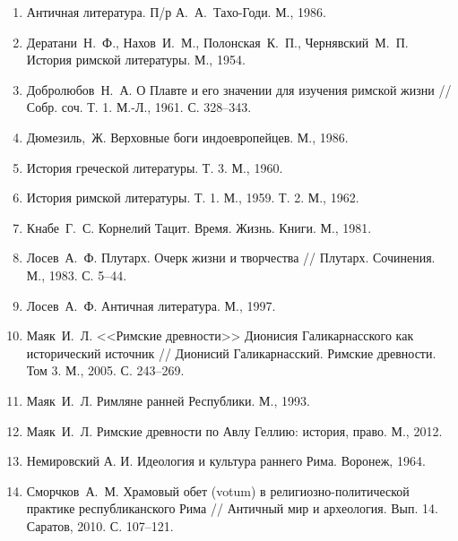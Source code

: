 \begin{flushleft}
\begin{enumerate}



\item Античная литература. П/р А.~А.~Тахо-Годи. М., 1986.

\item Дератани~Н.~Ф., Нахов~И.~М., Полонская~К.~П., Чернявский~М.~П. История римской литературы. М., 1954.

\item Добролюбов~Н.~А. О Плавте и его значении для изучения римской жизни // Собр. соч. Т. 1. М.-Л., 1961. С. 328--343. %

\item Дюмезиль,~Ж. Верховные боги индоевропейцев. М., 1986.

\item История греческой литературы. Т. 3. М., 1960.

\item История римской литературы. Т. 1. М., 1959. Т. 2. М., 1962.

\item Кнабе~Г.~С. Корнелий Тацит. Время. Жизнь. Книги. М., 1981.

\item Лосев~А.~Ф. Плутарх. Очерк жизни и творчества // Плутарх. Сочинения. М., 1983. С. 5--44.

\item Лосев~А.~Ф. Античная литература. М., 1997.

\item Маяк~И.~Л. <<Римские древности>> Дионисия Галикарнасского как исторический источник // Дионисий Галикарнасский. Римские древности. Том 3. М., 2005. С. 243--269.

\item Маяк~И.~Л. Римляне ранней Республики. М., 1993.

\item Маяк~И.~Л. Римские древности по Авлу Геллию: история, право. М., 2012.

\item Немировский А. И. Идеология и культура раннего Рима. Воронеж, 1964.

\item Сморчков~А.~М. Храмовый обет (votum) в религиозно-политической практике республиканского Рима // Античный мир и археология. Вып. 14. Саратов, 2010. С. 107--121.


\end{enumerate}
\end{flushleft}
